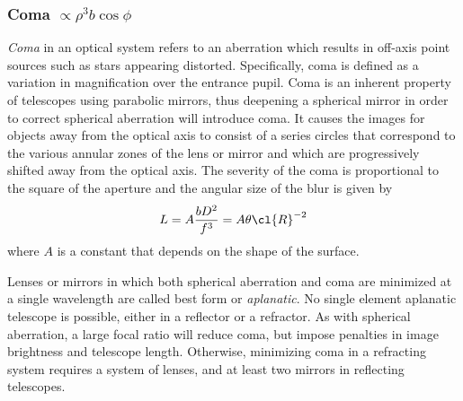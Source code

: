 
\subsubsection{Coma $\propto \rho^3b\cos\phi$}

{\it Coma} in an optical system refers to an aberration which results
in off-axis point sources such as stars appearing distorted. Specifically, 
coma is defined as a variation in magnification over the entrance pupil. 
Coma is an inherent property of telescopes using parabolic mirrors, thus
deepening a spherical mirror in order to correct spherical aberration will
introduce coma. It causes the images for objects away from the optical axis
to consist of a series circles that correspond to the various annular 
zones of the lens or mirror and which are progressively shifted away from 
the optical axis. The severity of the coma is proportional to the square of
the aperture and the angular size of the blur is given by
\[ 
L=A{bD^2\over f^3}=A\theta\cl{R}^{-2}
\]
where $A$ is a constant that depends on the shape of the surface.



Lenses or mirrors in which both spherical aberration and coma are minimized at a single
wavelength are called best form or {\it aplanatic}. No single element aplanatic telescope
is possible, either in a reflector or a refractor. As with spherical aberration, a large
focal ratio will reduce coma, but impose penalties in image brightness and telescope length.
Otherwise, minimizing coma in a refracting system requires a system of lenses, and at least
two mirrors in reflecting telescopes.

